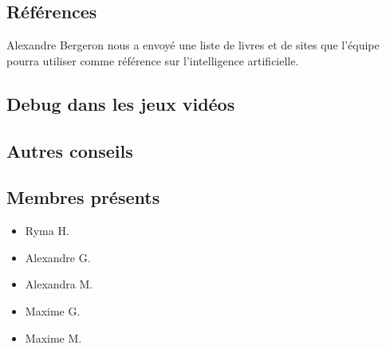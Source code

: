 \documentclass[12pt,letterpaper,twoside]{article}
\begin{document}
\subsection*{Références}
Alexandre Bergeron nous a envoyé une liste de livres et de sites que l'équipe pourra utiliser comme référence sur l'intelligence artificielle.

\subsection*{Debug dans les jeux vidéos}

\subsection*{Autres conseils}

\subsection*{Membres présents}
\begin{itemize}
\item Ryma H.
\item Alexandre G.
\item Alexandra M.
\item Maxime G.
\item Maxime M.
\end{itemize}
\end{document}
